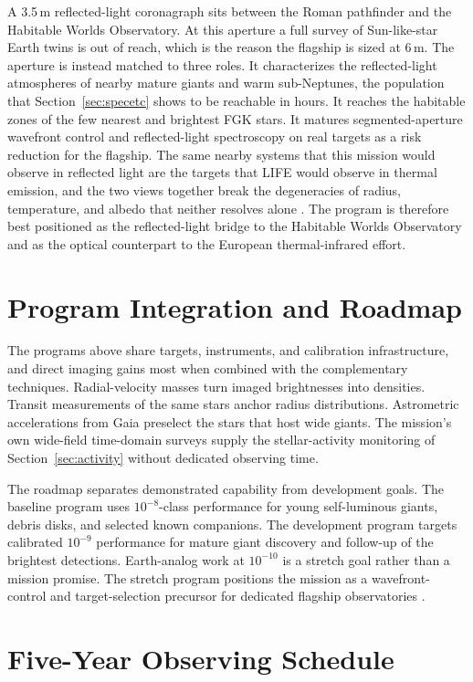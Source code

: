 A 3.5\,m reflected-light coronagraph sits between the Roman pathfinder and
the Habitable Worlds Observatory. At this aperture a full survey of
Sun-like-star Earth twins is out of reach, which is the reason the
flagship is sized at 6\,m. The aperture is instead matched to three
roles. It characterizes the reflected-light atmospheres of nearby mature
giants and warm sub-Neptunes, the population that Section~\ref{sec:specetc}
shows to be reachable in hours. It reaches the habitable zones of the few
nearest and brightest FGK stars. It matures segmented-aperture wavefront
control and reflected-light spectroscopy on real targets as a risk
reduction for the flagship. The same nearby systems that this mission
would observe in reflected light are the targets that LIFE would observe
in thermal emission, and the two views together break the degeneracies of
radius, temperature, and albedo that neither resolves alone
\cite{quanz22}. The program is therefore best positioned as the
reflected-light bridge to the Habitable Worlds Observatory and as the
optical counterpart to the European thermal-infrared effort.

\section{Program Integration and Roadmap}
\label{sec:roadmap}

The programs above share targets, instruments, and calibration
infrastructure, and direct imaging gains most when combined with the
complementary techniques. Radial-velocity masses turn imaged
brightnesses into densities. Transit measurements of the same stars
anchor radius distributions. Astrometric accelerations from Gaia
preselect the stars that host wide giants. The mission's own wide-field
time-domain surveys supply the stellar-activity monitoring of
Section~\ref{sec:activity} without dedicated observing time.

The roadmap separates demonstrated capability from development goals.
The baseline program uses $10^{-8}$-class performance for young
self-luminous giants, debris disks, and selected known companions. The
development program targets calibrated $10^{-9}$ performance for mature
giant discovery and follow-up of the brightest detections. Earth-analog
work at $10^{-10}$ is a stretch goal rather than a mission promise. The
stretch program positions the mission as a wavefront-control and
target-selection precursor for dedicated flagship observatories
\cite{quanz22,hwo26}.

\section{Five-Year Observing Schedule}
\label{sec:schedule}

